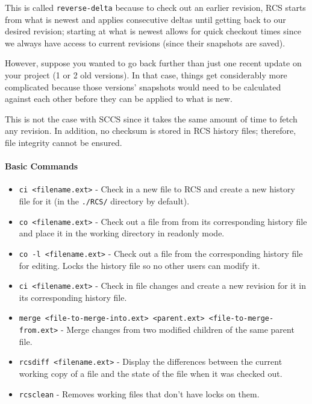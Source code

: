 This is called \lstinline{reverse-delta} because to check out an earlier revision, RCS starts from what is newest and applies consecutive deltas until getting back to our desired revision; starting at what is newest allows for quick checkout times since we always have access to current revisions (since their snapshots are saved).

However, suppose you wanted to go back further than just one recent update on your project (1 or 2 old versions). In that case, things get considerably more complicated because those versions' snapshots would need to be calculated against each other before they can be applied to what is new.

This is not the case with SCCS since it takes the same amount of time to fetch any revision. In addition, no checksum is stored in RCS history files; therefore, file integrity cannot be ensured.

\paragraph{Basic Commands}

\begin{itemize}
    \item \lstinline{ci <filename.ext>} - Check in a new file to RCS and create a new history file for it (in the \lstinline{./RCS/} directory by default).
    \item \lstinline{co <filename.ext>} - Check out a file from from its corresponding history file and place it in the working directory in readonly mode.
    \item \lstinline{co -l <filename.ext>} - Check out a file from the corresponding history file for editing. Locks the history file so no other users can modify it.
    \item \lstinline{ci <filename.ext>} - Check in file changes and create a new revision for it in its corresponding history file.
    \item \lstinline{merge <file-to-merge-into.ext> <parent.ext> <file-to-merge-from.ext>} - Merge changes from two modified children of the same parent file.
    \item \lstinline{rcsdiff <filename.ext>} - Display the differences between the current working copy of a file and the state of the file when it was checked out.
    \item \lstinline{rcsclean} - Removes working files that don't have locks on them.
\end{itemize}

